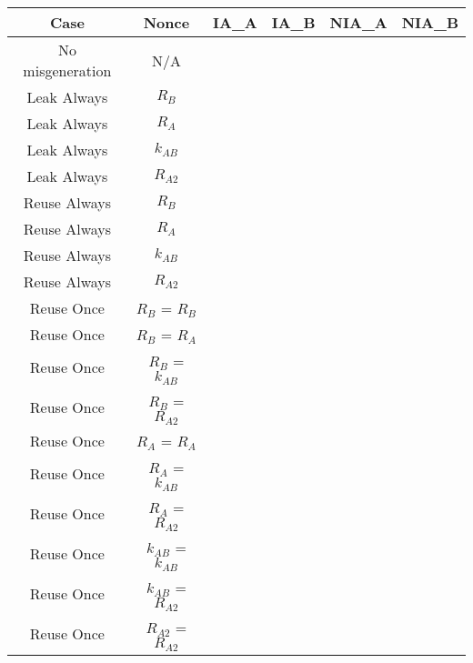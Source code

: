 \documentclass[crop]{standalone}
\newcommand{\noattack}{\color{ForestGreen}\usym{2713}\color{black}}
\newcommand{\attack}{\color{red}\usym{2717}\color{black}}
\begin{document}
\parbox{15cm}{
\begin{tabular}{|c|c|c|c|c|c|}
\hline
Case & Nonce & IA\_A & IA\_B & NIA\_A & NIA\_B \\ \hline
No misgeneration & N/A & \noattack & \noattack & \noattack & \noattack\\ \hline
Leak Always & $R_B$ & \noattack & \noattack & \noattack & \noattack\\ \hline
Leak Always & $R_A$ & \noattack & \noattack & \noattack & \noattack\\ \hline
Leak Always & $k_{AB}$ & \attack & \attack & \attack & \attack\\ \hline
Leak Always & $R_{A2}$ & \noattack & \noattack & \noattack & \noattack\\ \hline
Reuse Always & $R_B$ & \noattack & \attack & \noattack & \noattack\\ \hline
Reuse Always & $R_A$ & \noattack & \noattack & \noattack & \noattack\\ \hline
Reuse Always & $k_{AB}$ & \attack & \attack & \attack & \attack\\ \hline
Reuse Always & $R_{A2}$ & \noattack & \noattack & \noattack & \noattack\\ \hline
Reuse Once & $R_B$ = $R_B$ & \noattack & \attack & \noattack & \noattack\\ \hline
Reuse Once & $R_B$ = $R_A$ & \noattack & \noattack & \noattack & \noattack\\ \hline
Reuse Once & $R_B$ = $k_{AB}$ & \attack & \attack & \attack & \attack\\ \hline
Reuse Once & $R_B$ = $R_{A2}$ & \noattack & \noattack & \noattack & \noattack\\ \hline
Reuse Once & $R_A$ = $R_A$ & \noattack & \noattack & \noattack & \noattack\\ \hline
Reuse Once & $R_A$ = $k_{AB}$ & \attack & \attack & \attack & \attack\\ \hline
Reuse Once & $R_A$ = $R_{A2}$ & \noattack & \noattack & \noattack & \noattack\\ \hline
Reuse Once & $k_{AB}$ = $k_{AB}$ & \attack & \attack & \attack & \attack\\ \hline
Reuse Once & $k_{AB}$ = $R_{A2}$ & \attack & \attack & \attack & \attack\\ \hline
Reuse Once & $R_{A2}$ = $R_{A2}$ & \noattack & \noattack & \noattack & \noattack\\ \hline
\end{tabular}}
\end{document}
